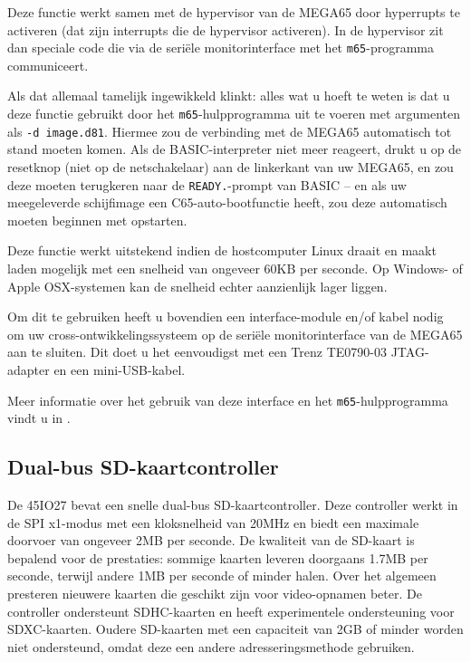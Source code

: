 Deze functie werkt samen met de hypervisor van de MEGA65 door hyperrupts te activeren (dat zijn interrupts die de hypervisor activeren). In de hypervisor zit dan speciale code die via de seriële monitorinterface met het {\tt m65}-programma communiceert.

Als dat allemaal tamelijk ingewikkeld klinkt: alles wat u hoeft te weten is dat u deze functie gebruikt door het {\tt m65}-hulpprogramma uit te voeren met argumenten als {\tt -d image.d81}. Hiermee zou de verbinding met de MEGA65 automatisch tot stand moeten komen. Als de BASIC-interpreter niet meer reageert, drukt u op de resetknop (niet op de netschakelaar) aan de linkerkant van uw MEGA65, en zou deze moeten terugkeren naar de {\tt READY.}-prompt van BASIC -- en als uw meegeleverde schijfimage een C65-auto-bootfunctie heeft, zou deze automatisch moeten beginnen met opstarten.

Deze functie werkt uitstekend indien de hostcomputer Linux draait en maakt laden mogelijk met een snelheid van ongeveer 60KB per seconde. Op Windows- of Apple OSX-systemen kan de snelheid echter aanzienlijk lager liggen.

Om dit te gebruiken heeft u bovendien een interface-module en/of kabel nodig om uw cross-ontwikkelingssysteem op de seriële monitorinterface van de MEGA65 aan te sluiten. Dit doet u het eenvoudigst met een Trenz TE0790-03 JTAG-adapter en een mini-USB-kabel.

Meer informatie over het gebruik van deze interface en het {\tt m65}-hulpprogramma vindt u in .

\subsection{Dual-bus SD-kaartcontroller}

De 45IO27 bevat een snelle dual-bus SD-kaartcontroller. Deze controller werkt in de SPI x1-modus met een kloksnelheid van 20MHz en biedt een maximale doorvoer van ongeveer 2MB per seconde. De kwaliteit van de SD-kaart is bepalend voor de prestaties: sommige kaarten leveren doorgaans 1.7MB per seconde, terwijl andere 1MB per seconde of minder halen. Over het algemeen presteren nieuwere kaarten die geschikt zijn voor video-opnamen beter. De controller ondersteunt SDHC-kaarten en heeft experimentele ondersteuning voor SDXC-kaarten. Oudere SD-kaarten met een capaciteit van 2GB of minder worden niet ondersteund, omdat deze een andere adresseringsmethode gebruiken.

